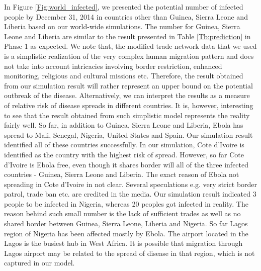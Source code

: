 \documentclass[10pt, journal,onecolumn]{IEEEtran}
\begin{document}
In Figure \ref{Fig:world_infected}, we presented the potential number of infected people by December 31, 2014 in countries other than Guinea, Sierra Leone and Liberia based on our world-wide simulations. The number for Guinea, Sierra Leone and Liberia are similar to the result presented in Table \ref{Tb:prediction} in Phase 1 as expected. We note that, the modified trade network data that we used is a simplistic realization of the very complex human migration pattern and does not take into account intricacies involving border restriction, enhanced monitoring, religious and cultural missions etc. Therefore, the result obtained from our simulation result will rather represent  an upper bound on the potential outbreak of the disease. Alternatively, we can interpret the results as a measure of relative risk of disease spreads in different countries. It is, however, interesting to see that the result obtained from such simplistic model represents the reality fairly well. So far, in addition to  Guinea, Sierra Leone and Liberia, Ebola has spread to Mali, Senegal, Nigeria, United States and Spain. Our simulation result identified all of these countries successfully. In our simulation, Cote d'Ivoire is identified as the country with the highest risk of spread. However, so far Cote d'Ivoire is Ebola free, even though it shares border will all of the three infected countries - Guinea, Sierra Leone and Liberia. The exact reason of Ebola not spreading in Cote d'Ivoire in not clear. Several speculations e.g. very strict border patrol, trade ban etc. are credited in the media. Our simulation result indicated 3 people to be infected in Nigeria, whereas 20 peoples got infected in reality. The reason behind such small number is the lack of sufficient trades as well as no shared border between Guinea, Sierra Leone, Liberia and Nigeria. So far Lagos region of Nigeria has been affected mostly by Ebola. The airport located in the Lagos is the busiest hub in West Africa. It is possible that migration through Lagos airport may be related to the spread of disease in that region, which is not captured in our model.









\end{document}
